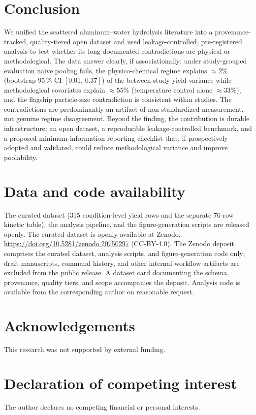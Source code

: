 \section{Conclusion}
We unified the scattered aluminum--water hydrolysis literature into a provenance-tracked,
quality-tiered open dataset and used leakage-controlled, pre-registered analysis to test
whether its long-documented contradictions are physical or methodological. The data answer
clearly, if associationally: under study-grouped evaluation naive pooling fails, the
physico-chemical regime explains $\approx\!2\%$ (bootstrap 95\,\% CI $[0.01,\,0.37]$) of the between-study yield variance while
methodological covariates explain $\approx\!55\%$ (temperature control alone $\approx\!33\%$),
and the flagship particle-size contradiction is consistent within studies. The contradictions
are predominantly an artifact of non-standardized measurement, not genuine regime
disagreement. Beyond the finding, the contribution is durable infrastructure: an open
dataset, a reproducible leakage-controlled benchmark, and a proposed minimum-information
reporting checklist that, if prospectively adopted and validated, could reduce methodological
variance and improve poolability.

\section*{Data and code availability}
The curated dataset (315 condition-level yield rows and the separate 76-row kinetic table), the
analysis pipeline, and the figure-generation scripts are released openly. The curated dataset is
openly available at Zenodo, \url{https://doi.org/10.5281/zenodo.20750297} (CC-BY-4.0). The Zenodo
deposit comprises the curated dataset, analysis scripts, and figure-generation code only; draft
manuscripts, command history, and other internal workflow artifacts are excluded from the public
release. A dataset card documenting the schema, provenance, quality tiers, and scope accompanies
the deposit. Analysis code is available from the corresponding author on reasonable request.

\section*{Acknowledgements}
This research was not supported by external funding.

\section*{Declaration of competing interest}
The author declares no competing financial or personal interests.

